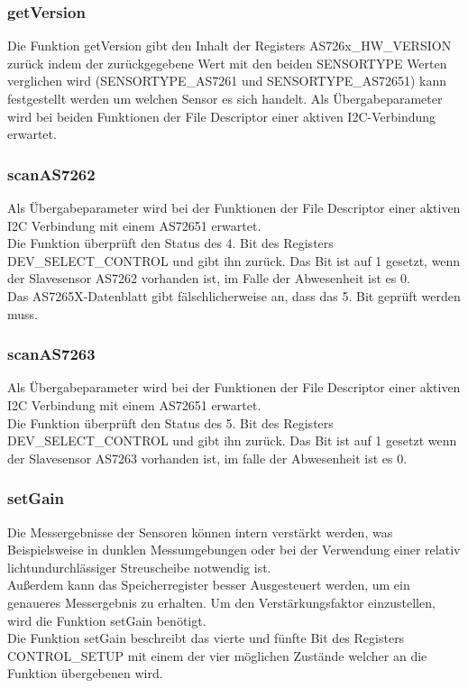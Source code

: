 

\subsubsection{getVersion}
Die Funktion getVersion gibt den Inhalt der Registers AS726x\_HW\_VERSION zurück indem der zurückgegebene Wert mit den beiden SENSORTYPE Werten verglichen wird (SENSORTYPE\_AS7261 und SENSORTYPE\_AS72651) kann festgestellt werden um welchen Sensor es sich handelt. 
Als Übergabeparameter wird bei beiden Funktionen der File Descriptor einer aktiven I2C-Verbindung erwartet.

\subsubsection{scanAS7262}
Als Übergabeparameter wird bei der Funktionen der File Descriptor einer aktiven I2C Verbindung mit einem AS72651 erwartet.\\
Die Funktion überprüft den Status des 4. Bit des Registers DEV\_SELECT\_CONTROL und gibt ihn zurück. Das Bit ist auf 1 gesetzt, wenn der Slavesensor AS7262 vorhanden ist, im Falle der Abwesenheit ist es 0.\\
Das AS7265X-Datenblatt gibt fälschlicherweise an, dass das 5. Bit geprüft werden muss.\\

\subsubsection{scanAS7263}
Als Übergabeparameter wird bei der Funktionen der File Descriptor einer aktiven I2C Verbindung mit einem AS72651 erwartet.\\
Die Funktion überprüft den Status des 5. Bit des Registers DEV\_SELECT\_CONTROL und gibt ihn zurück. Das Bit ist auf 1 gesetzt wenn der Slavesensor AS7263 vorhanden ist, im falle der Abwesenheit ist es 0.\\

\subsubsection{setGain}
Die Messergebnisse der Sensoren können intern verstärkt werden, was Beispielsweise in dunklen Messumgebungen oder bei der Verwendung einer relativ lichtundurchlässiger Streuscheibe notwendig ist.\\
Außerdem kann das Speicherregister besser Ausgesteuert werden, um ein genaueres Messergebnis zu erhalten.
Um den Verstärkungsfaktor einzustellen, wird die Funktion setGain benötigt.\\
Die Funktion setGain beschreibt das vierte und fünfte Bit des Registers CONTROL\_SETUP mit einem der vier möglichen Zustände welcher an die Funktion übergebenen wird.

